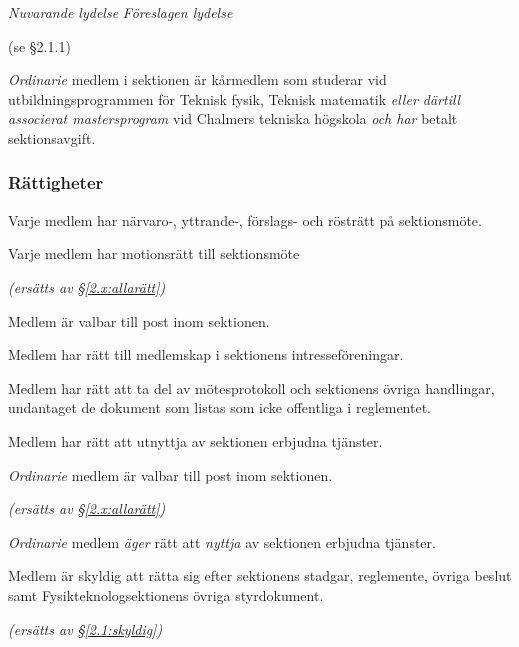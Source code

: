 \documentclass{article}
\newenvironment{lydelse}
    {\begin{paracol}{2}%
        \emph{Nuvarande lydelse}%
        \switchcolumn%
        \emph{Föreslagen lydelse}%
    \end{paracol}%
    \begin{enumerate}[label=\thesubsection.\arabic*]%
    \begin{paracol}{2}%
    }{\end{paracol}\end{enumerate}}
\begin{document}
\begin{lydelse}
    (se \S 2.1.1)

  \switchcolumn
    \item \emph{Ordinarie} medlem i sektionen är kårmedlem som studerar vid utbildningsprogrammen för Teknisk fysik, Teknisk matematik \emph{eller därtill associerat mastersprogram} vid Chalmers tekniska högskola \emph{och har} betalt sektionsavgift.

    \subsubsection*{Rättigheter}
  \switchcolumn*
  \setcounter{subsection}{2}
    \item Varje medlem har närvaro-, yttrande-, förslags- och rösträtt på sektionsmöte.
   
    \item Varje medlem har motionsrätt till sektionsmöte
    
  \switchcolumn
    \item[] \emph{(ersätts av \S\ref{2.x:allarätt})} 

  \switchcolumn*

    \item Medlem är valbar till post inom sektionen.

    \item Medlem har rätt till medlemskap i sektionens intresseföreningar.

    \item Medlem har rätt att ta del av mötesprotokoll och sektionens övriga handlingar, undantaget de dokument som listas som icke offentliga i reglementet.
    
    \item Medlem har rätt att utnyttja av sektionen erbjudna tjänster.
    
  \switchcolumn
    
    \item \emph{Ordinarie} medlem är valbar till post inom sektionen.
    
    \item[] \emph{(ersätts av \S\ref{2.x:allarätt})}
    
    \item \emph{Ordinarie} medlem \emph{äger} rätt att \emph{nyttja} av sektionen erbjudna tjänster.
    
    
  \switchcolumn*
  \setcounter{subsection}{3}
  \setcounter{enumi}{0}
    \item Medlem är skyldig att rätta sig efter sektionens stadgar, regle\-mente, övriga beslut samt Fysikteknologsektionens övriga styrdokument.
    
  \switchcolumn
    \emph{(ersätts av \S \ref{2.1:skyldig})}
\end{lydelse}
\end{document}
